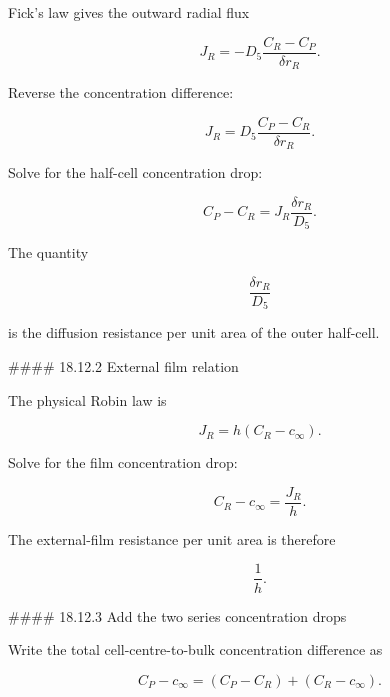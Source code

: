 \documentclass[11pt,a4paper]{article}
\begin{document}
Fick's law gives the outward radial flux

\begin{equation}
J_R
=
-D_5
\frac{C_R-C_P}{\delta r_R}.
\tag{TRISO-FV-182}
\label{eq:triso-fv-182}
\end{equation}

Reverse the concentration difference:

\begin{equation}
\boxed{
J_R
=
D_5
\frac{C_P-C_R}{\delta r_R}.
}
\tag{TRISO-FV-183}
\label{eq:triso-fv-183}
\end{equation}

Solve for the half-cell concentration drop:

\begin{equation}
C_P-C_R
=
J_R\frac{\delta r_R}{D_5}.
\tag{TRISO-FV-184}
\label{eq:triso-fv-184}
\end{equation}

The quantity

\begin{equation}
\frac{\delta r_R}{D_5}
\tag{TRISO-FV-185}
\label{eq:triso-fv-185}
\end{equation}

is the diffusion resistance per unit area of the outer half-cell.

\#\#\#\# 18.12.2 External film relation

The physical Robin law is

\begin{equation}
\boxed{
J_R
=
h(C_R-c_\infty).
}
\tag{TRISO-FV-186}
\label{eq:triso-fv-186}
\end{equation}

Solve for the film concentration drop:

\begin{equation}
C_R-c_\infty
=
\frac{J_R}{h}.
\tag{TRISO-FV-187}
\label{eq:triso-fv-187}
\end{equation}

The external-film resistance per unit area is therefore

\begin{equation}
\frac1h.
\tag{TRISO-FV-188}
\label{eq:triso-fv-188}
\end{equation}

\#\#\#\# 18.12.3 Add the two series concentration drops

Write the total cell-centre-to-bulk concentration difference as

\begin{equation}
C_P-c_\infty
=
(C_P-C_R)
+
(C_R-c_\infty).
\tag{TRISO-FV-189}
\label{eq:triso-fv-189}
\end{equation}
\end{document}
